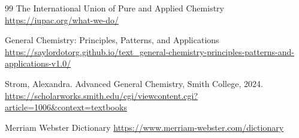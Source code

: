 {\footnotesize
\begin{thebibliography}{99}
	 The International Union of Pure and Applied Chemistry \url{https://iupac.org/what-we-do/}
	
	 General Chemistry: Principles, Patterns, and Applications \url{https://saylordotorg.github.io/text_general-chemistry-principles-patterns-and-applications-v1.0/}
	
	 Strom, Alexandra. Advanced General Chemistry, Smith College, 2024. \url{https://scholarworks.smith.edu/cgi/viewcontent.cgi?article=1006&context=textbooks}
	
	 Merriam Webster Dictionary \url{https://www.merriam-webster.com/dictionary}
\end{thebibliography}
}
